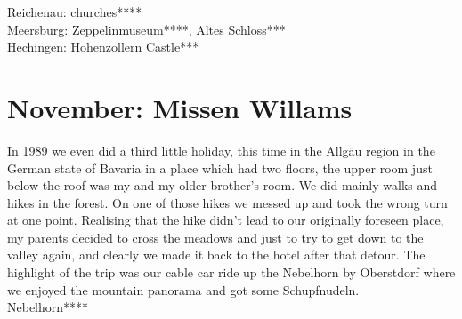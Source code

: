 Reichenau: churches****\\
Meersburg: Zeppelinmuseum****, Altes Schloss***\\
Hechingen: Hohenzollern Castle***

\section{November: Missen Willams}
\label{1989:MissenWillams}

In 1989 we even did a third little holiday, this time in the Allg\"au region in the German state of Bavaria in a place which had two floors, the upper room just below the roof was my and my older brother's room. We did mainly walks and hikes in the forest. On one of those hikes we messed up and took the wrong turn at one point. Realising that the hike didn't lead to our originally foreseen place, my parents decided to cross the meadows and just to try to get down to the valley again, and clearly we made it back to the hotel after that detour. The highlight of the trip was our cable car ride up the Nebelhorn by Oberstdorf where we enjoyed the mountain panorama and got some Schupfnudeln.\\

Nebelhorn****